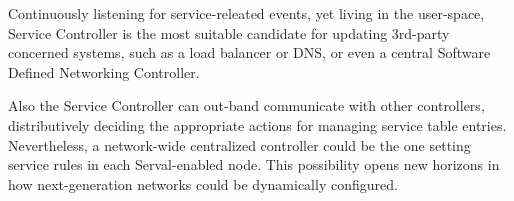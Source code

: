 Continuously listening for service-releated events, yet living in the user-space, Service Controller is the most suitable candidate for updating 3rd-party concerned systems, such as a load balancer or DNS, or even a central Software Defined Networking Controller.

Also the Service Controller can out-band communicate with other controllers, distributively deciding the appropriate actions for managing service table entries.
Nevertheless, a network-wide centralized controller could be the one setting service rules in each Serval-enabled node.
This possibility opens new horizons in how next-generation networks could be dynamically configured. 




